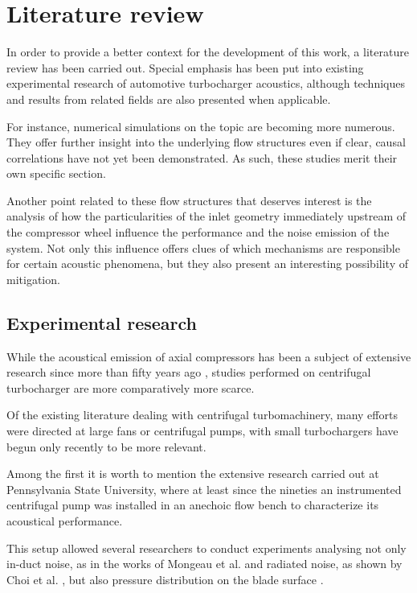 \chapter{Literature review} \label{cap:liter}

\noindent In order to provide a better context for the development of this work, a literature review has been carried out. Special emphasis has been put into existing experimental research of automotive turbocharger acoustics, although techniques and results from related fields are also presented when applicable.

For instance, numerical simulations on the topic are becoming more numerous. They offer further insight into the underlying flow structures even if clear, causal correlations have not yet been demonstrated. As such, these studies merit their own specific section. 

Another point related to these flow structures that deserves interest is the analysis of how the particularities of the inlet geometry immediately upstream of the compressor wheel influence the performance and the noise emission of the system. Not only this influence offers clues of which mechanisms are responsible for certain acoustic phenomena, but they also present an interesting possibility of mitigation.

\section{Experimental research}

While the acoustical emission of axial compressors has been a  subject of extensive research since more than fifty years ago \cite{nvemec1967noise,griffiths1964spectrum}, studies performed on centrifugal turbocharger are more comparatively more scarce. 

Of the existing literature dealing with centrifugal turbomachinery, many efforts were directed at large fans or centrifugal pumps, with small turbochargers have begun only recently to be more relevant.

Among the first it is worth to mention the extensive research carried out at Pennsylvania State University, where at least since the nineties \cite{mongeau1993sound} an instrumented centrifugal pump was installed in an anechoic flow bench to characterize its acoustical performance.

This setup allowed several researchers to conduct experiments analysing not only in-duct noise, as in the works of Mongeau et al. \cite{mongeau1993sound,mongeau1995method} and radiated noise, as shown by Choi et al. \cite{choi1994aerodynamic,choi2003experiments}, but also pressure distribution on the blade surface \cite{mongeau1993sound,choi1994aerodynamic}.

